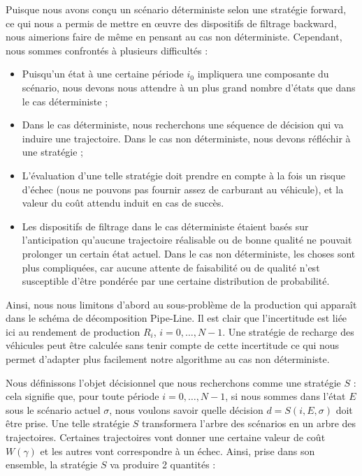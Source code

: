 { Puisque nous avons conçu un scénario déterministe selon une stratégie forward, ce qui nous a permis de mettre en œuvre des dispositifs de filtrage backward, nous aimerions faire de même en pensant au cas non déterministe.  Cependant, nous sommes confrontés à plusieurs difficultés :
 
 \begin{itemize}[label=$\square$]	
 	\item Puisqu'un état à une certaine période $i_0$ impliquera une composante du scénario, nous devons nous attendre à un plus grand nombre d'états que dans le cas déterministe ;
 \item Dans le cas déterministe, nous recherchons une séquence de décision qui va induire une trajectoire. Dans le cas non déterministe, nous devons réfléchir à une stratégie ;
 \item L'évaluation d'une telle stratégie doit prendre en compte à la fois un risque d'échec (nous ne pouvons pas fournir assez de carburant au véhicule), et la valeur du coût attendu induit en cas de succès. 
 \item  Les dispositifs de filtrage dans le cas déterministe étaient basés sur l'anticipation qu'aucune trajectoire réalisable ou de bonne qualité ne pouvait prolonger un certain état actuel. Dans le cas non déterministe, les choses sont plus compliquées, car aucune attente de faisabilité ou de qualité n'est susceptible d'être pondérée par une certaine distribution de probabilité.  
\end{itemize}

 Ainsi, nous nous limitons d'abord au sous-problème de la production qui apparaît dans le schéma de décomposition Pipe-Line. Il est clair que l'incertitude est liée ici au rendement de production $R_i$, $i = 0,\dots, N-1$. Une stratégie de recharge des véhicules peut être calculée sans tenir compte de cette incertitude ce qui nous permet d'adapter plus facilement notre algorithme au cas non déterministe.  
 
 Nous définissons l'objet décisionnel que nous recherchons comme une stratégie $S$ : cela signifie que, pour toute période $i = 0, \dots, N-1$, si nous sommes dans l'état $E$ sous le scénario actuel $\sigma$, nous voulons savoir quelle décision $d = S(i, E, \sigma)$ doit être prise. Une telle stratégie $S$ transformera l'arbre des scénarios en un arbre des trajectoires.  Certaines trajectoires vont donner une certaine valeur de coût $W(\gamma)$ et les autres vont correspondre à un échec. Ainsi, prise dans son ensemble, la stratégie $S$ va produire 2 quantités :
 
}
